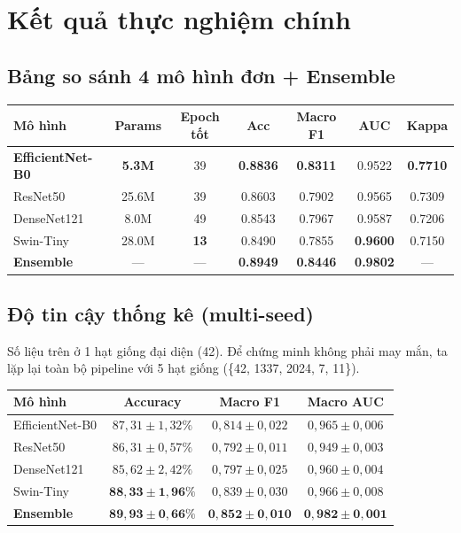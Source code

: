 \documentclass[11pt,a4paper]{article}
\begin{document}
\section{Kết quả thực nghiệm chính}

\subsection{Bảng so sánh 4 mô hình đơn + Ensemble}

\begin{table}[h]
\centering\small
\begin{tabular}{lcccccc}
\toprule
\textbf{Mô hình} & \textbf{Params} & \textbf{Epoch tốt} & \textbf{Acc} & \textbf{Macro F1} & \textbf{AUC} & \textbf{Kappa} \\
\midrule
\textbf{EfficientNet-B0} & \textbf{5.3M} & 39 & \textbf{0.8836} & \textbf{0.8311} & 0.9522 & \textbf{0.7710} \\
ResNet50                 & 25.6M & 39 & 0.8603 & 0.7902 & 0.9565 & 0.7309 \\
DenseNet121              & 8.0M  & 49 & 0.8543 & 0.7967 & 0.9587 & 0.7206 \\
Swin-Tiny                & 28.0M & \textbf{13} & 0.8490 & 0.7855 & \textbf{0.9600} & 0.7150 \\
\midrule
\rowcolor{usthblue!10}
\textbf{Ensemble} & --- & --- & \textbf{0.8949} & \textbf{0.8446} & \textbf{0.9802} & --- \\
\bottomrule
\end{tabular}
\end{table}

\subsection{Độ tin cậy thống kê (multi-seed)}

Số liệu trên ở 1 hạt giống đại diện (42). Để chứng minh không phải may mắn, ta lặp lại toàn bộ pipeline với 5 hạt giống (\{42, 1337, 2024, 7, 11\}).

\begin{table}[h]
\centering\small
\begin{tabular}{lccc}
\toprule
\textbf{Mô hình} & \textbf{Accuracy} & \textbf{Macro F1} & \textbf{Macro AUC} \\
\midrule
EfficientNet-B0 & $87{,}31 \pm 1{,}32\%$ & $0{,}814 \pm 0{,}022$ & $0{,}965 \pm 0{,}006$ \\
ResNet50        & $86{,}31 \pm 0{,}57\%$ & $0{,}792 \pm 0{,}011$ & $0{,}949 \pm 0{,}003$ \\
DenseNet121     & $85{,}62 \pm 2{,}42\%$ & $0{,}797 \pm 0{,}025$ & $0{,}960 \pm 0{,}004$ \\
Swin-Tiny       & $\mathbf{88{,}33 \pm 1{,}96\%}$ & $0{,}839 \pm 0{,}030$ & $0{,}966 \pm 0{,}008$ \\
\midrule
\rowcolor{usthblue!10}
\textbf{Ensemble} & $\mathbf{89{,}93 \pm 0{,}66\%}$ & $\mathbf{0{,}852 \pm 0{,}010}$ & $\mathbf{0{,}982 \pm 0{,}001}$ \\
\bottomrule
\end{tabular}
\end{table}
\end{document}

